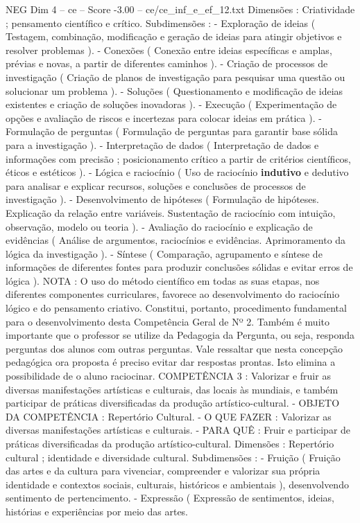 \begin{textsample}{NEG Dim 4 – ce – Score -3.00 – ce/ce\_inf\_e\_ef\_12.txt}
Dimensões : Criatividade ; pensamento científico e crítico.
Subdimensões : - Exploração de ideias ( Testagem, combinação, modificação e geração de ideias para atingir objetivos e resolver problemas ). - Conexões ( Conexão entre ideias específicas e amplas, prévias e novas, a partir de diferentes caminhos ). - Criação de processos de investigação ( Criação de planos de investigação para pesquisar uma questão ou solucionar um problema ). - Soluções ( Questionamento e modificação de ideias existentes e criação de soluções inovadoras ). - Execução ( Experimentação de opções e avaliação de riscos e incertezas para colocar ideias em prática ). - Formulação de perguntas ( Formulação de perguntas para garantir base sólida para a investigação ). - Interpretação de dados ( Interpretação de dados e informações com precisão ; posicionamento crítico a partir de critérios científicos, éticos e estéticos ). - Lógica e raciocínio ( Uso de raciocínio \textbf{indutivo} e dedutivo para analisar e explicar recursos, soluções e conclusões de processos de investigação ). - Desenvolvimento de hipóteses ( Formulação de hipóteses.
Explicação da relação entre variáveis.
Sustentação de raciocínio com intuição, observação, modelo ou teoria ). - Avaliação do raciocínio e explicação de evidências ( Análise de argumentos, raciocínios e evidências.
Aprimoramento da lógica da investigação ). - Síntese ( Comparação, agrupamento e síntese de informações de diferentes fontes para produzir conclusões sólidas e evitar erros de lógica ).
NOTA : O uso do método científico em todas as suas etapas, nos diferentes componentes curriculares, favorece ao desenvolvimento do raciocínio lógico e do pensamento criativo.
Constitui, portanto, procedimento fundamental para o desenvolvimento desta Competência Geral de Nº 2.
Também é muito importante que o professor se utilize da Pedagogia da Pergunta, ou seja, responda perguntas dos alunos com outras perguntas.
Vale ressaltar que nesta concepção pedagógica ora proposta é preciso evitar dar respostas prontas.
Isto elimina a possibilidade de o aluno raciocinar.
COMPETÊNCIA 3 : Valorizar e fruir as diversas manifestações artísticas e culturais, das locais às mundiais, e também participar de práticas diversificadas da produção artístico-cultural. - OBJETO DA COMPETÊNCIA : Repertório Cultural. - O QUE FAZER : Valorizar as diversas manifestações artísticas e culturais. - PARA QUÊ : Fruir e participar de práticas diversificadas da produção artístico-cultural.
Dimensões : Repertório cultural ; identidade e diversidade cultural.
Subdimensões : - Fruição ( Fruição das artes e da cultura para vivenciar, compreender e valorizar sua própria identidade e contextos sociais, culturais, históricos e ambientais ), desenvolvendo sentimento de pertencimento. - Expressão ( Expressão de sentimentos, ideias, histórias e experiências por meio das artes.

\end{textsample}
